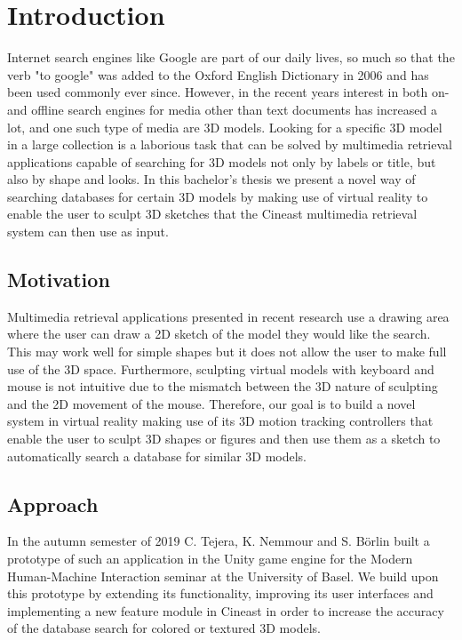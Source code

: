 \chapter{Introduction}

Internet search engines like Google are part of our daily lives, so much so that the verb "to google" was added to the Oxford English Dictionary in 2006 and has been used commonly ever since. However, in the recent years interest in 
both on- and offline search engines for media other than text documents has increased a lot, and one such type of media are 3D models. Looking for a specific 3D model in a large collection is a laborious task that can be solved by multimedia retrieval applications capable of searching for 3D models not only by labels or title, but also by shape and looks. In this bachelor's thesis we present a novel way of searching databases for certain 3D models by making use of virtual reality to enable the user to sculpt 3D sketches that the Cineast multimedia retrieval system can then use as input.

\section{Motivation}

Multimedia retrieval applications presented in recent research use a drawing area where the user can draw a 2D sketch of the model they would like the search. This may work well for simple shapes but it does not allow the user to make full use of the 3D space. Furthermore, sculpting virtual models with keyboard and mouse is not intuitive due to the mismatch between the 3D nature of sculpting and the 2D movement of the mouse. Therefore, our goal is to build a novel system in virtual reality making use of its 3D motion tracking controllers that enable the user to sculpt 3D shapes or figures and then use them as a sketch to automatically search a database for similar 3D models.

\section{Approach}
\label{sec:approach}

In the autumn semester of 2019 C. Tejera, K. Nemmour and S. Börlin built a prototype of such an application in the Unity game engine for the Modern Human-Machine Interaction seminar at the University of Basel.
We build upon this prototype by extending its functionality, improving its user interfaces and implementing a new feature module in Cineast in order to increase the accuracy of the database search for colored or textured 3D models.